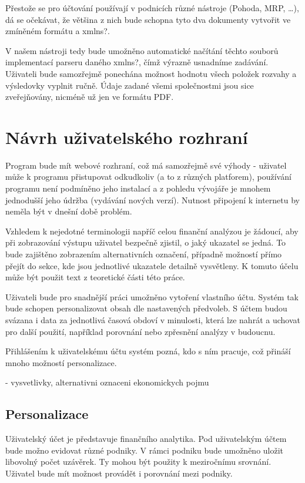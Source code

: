 Přestože se pro účtování používají v podnicích různé nástroje (Pohoda, MRP, \dots), dá se očekávat, že většina z nich bude schopna tyto dva dokumenty vytvořit ve zmíněném formátu a xmlns?.

V našem nástroji tedy bude umožněno automatické načítání těchto souborů implementací parseru daného xmlns?, čímž výrazně usnadníme zadávání.
Uživateli bude samozřejmě ponechána možnost hodnotu všech položek rozvahy a výsledovky vyplnit ručně. Údaje zadané všemi společnostmi jsou sice zveřejňovány, nicméně už jen ve formátu PDF.

\section{Návrh uživatelského rozhraní}
Program bude mít webové rozhraní, což má samozřejmě své výhody - uživatel může k programu přistupovat odkudkoliv (a to z různých platforem), používání programu není podmíněno jeho instalací a z pohledu vývojáře je mnohem jednodušší jeho údržba (vydávání nových verzí). Nutnost připojení k internetu by neměla být v dnešní době problém.

Vzhledem k nejedotné terminologii napříč celou finanční analýzou je žádoucí, aby při zobrazování výstupu uživatel bezpečně zjistil, o jaký ukazatel se jedná. To bude zajištěno zobrazením alternativních označení, případně možností přímo přejít do sekce, kde jsou jednotlivé ukazatele detailně vysvětleny. K tomuto účelu může být použit text z teoretické části této práce.



Uživateli bude pro snadnější práci umožněno vytoření vlastního účtu. Systém tak bude schopen personalizovat obsah dle nastavených předvoleb. S účtem budou svázana i data za jednotlivá časová obdoví v minulosti, která lze nahrát a uchovat pro další použití, například porovnání nebo zpřesnění analýzy v budoucnu.

Přihlášením k uživatelskému účtu systém pozná, kdo s ním pracuje, což přináší mnoho možností personalizace.


- vysvetlivky, alternativni oznaceni ekonomickych pojmu



\subsection{Personalizace}
Uživatelský účet je představuje finančního analytika. Pod uživatelským účtem bude možno evidovat různé podniky. V rámci podniku bude umožněno uložit libovolný počet uzávěrek. Ty mohou být použity k meziročnímu srovnání.
Uživatel bude mít možnost provádět i porovnání mezi podniky.

